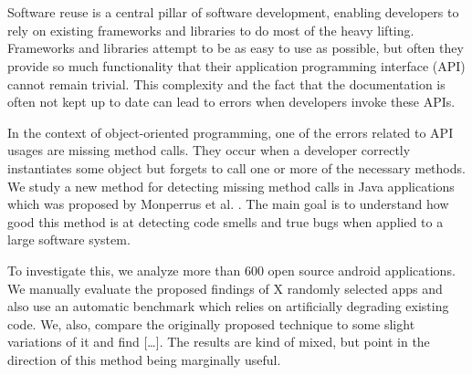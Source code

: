 \chapter{\abstractname}

Software reuse is a central pillar of software development, enabling developers to rely on existing frameworks and libraries to do most of the heavy lifting.
Frameworks and libraries attempt to be as easy to use as possible, but often they provide so much functionality that their application programming interface (API) cannot remain trivial.
This complexity and the fact that the documentation is often not kept up to date can lead to errors when developers invoke these APIs.

In the context of object-oriented programming, one of the errors related to API usages are missing method calls.
They occur when a developer correctly instantiates some object but forgets to call one or more of the necessary methods.
We study a new method for detecting missing method calls in Java applications which was proposed by Monperrus et al. \cite{monperrus2010detecting}.
The main goal is to understand how good this method is at detecting code smells and true bugs when applied to a large software system.

To investigate this, we analyze more than 600 open source android applications.
We manually evaluate the proposed findings of X randomly selected apps and also use an automatic benchmark which relies on artificially degrading existing code.
We, also, compare the originally proposed technique to some slight variations of it and find [\ldots].
The results are kind of mixed, but point in the direction of this method being marginally useful.
